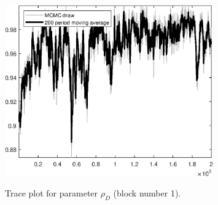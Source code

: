 \begin{figure}[H]
\centering
  \includegraphics[width=0.8\textwidth]{BRS_sectoral_rest/graphs/TracePlot_rho_D_blck_1}\\
    \caption{Trace plot for parameter ${\rho_D}$ (block number 1).}
\end{figure}
